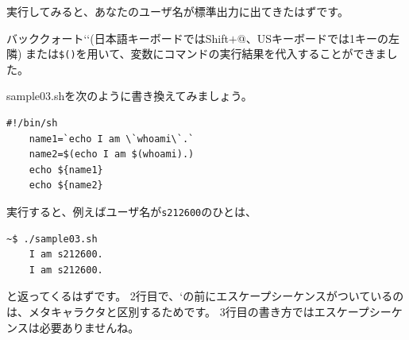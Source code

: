 \documentclass[a4j]{ltjreport}
\begin{document}
    実行してみると、あなたのユーザ名が標準出力に出てきたはずです。

    バッククォート`\quad`(日本語キーボードではShift$+$@、USキーボードでは1キーの左隣)
    または\texttt{\$(\quad)}を用いて、変数にコマンドの実行結果を代入することができました。


    sample03.shを次のように書き換えてみましょう。
    \begin{lstlisting}[caption=sample03.sh 改]
    #!/bin/sh
    name1=`echo I am \`whoami\`.`
    name2=$(echo I am $(whoami).)
    echo ${name1}
    echo ${name2}
    \end{lstlisting}

    実行すると、例えばユーザ名が\texttt{s212600}のひとは、
    \begin{lstlisting}[numbers=none]
    ~$ ./sample03.sh
    I am s212600.
    I am s212600.
    \end{lstlisting}
    と返ってくるはずです。
    2行目で、`の前にエスケープシーケンスがついているのは、メタキャラクタと区別するためです。
    3行目の書き方ではエスケープシーケンスは必要ありませんね。
\end{document}
